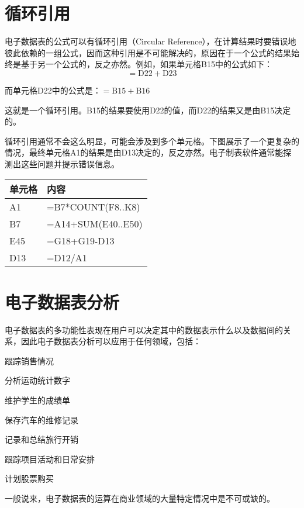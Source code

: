 \section{循环引用}


电子数据表的公式可以有循环引用（Circular Reference），在计算结果时要错误地彼此依赖的一组公式，因而这种引用是不可能解决的，原因在于一个公式的结果始终是基于另一个公式的，反之亦然。例如，如果单元格B15中的公式如下：$$=\text{D22}+\text{D23}$$


而单元格D22中的公式是：$=\text{B15}+\text{B16}$

这就是一个循环引用。B15的结果要使用D22的值，而D22的结果又是由B15决定的。

循环引用通常不会这么明显，可能会涉及到多个单元格。下图展示了一个更复杂的情况，最终单元格A1的结果是由D13决定的，反之亦然。电子制表软件通常能探测出这些问题并提示错误信息。

\begin{table}[!h]
\centering
\begin{tabular}{|p{100pt}|p{200pt}|}
\hline
单元格	&内容\\
\hline
A1		&=B7*COUNT(F8..K8)\\
\hline
B7		&=A14+SUM(E40..E50)\\
\hline
E45		&=G18+G19-D13\\
\hline
D13	&=D12/A1\\
\hline
\end{tabular}
\end{table}


\section{电子数据表分析}


电子数据表的多功能性表现在用户可以决定其中的数据表示什么以及数据间的关系，因此电子数据表分析可以应用于任何领域，包括：

\begin{compactitem}
\item 跟踪销售情况
\item 分析运动统计数字
\item 维护学生的成绩单
\item 保存汽车的维修记录
\item 记录和总结旅行开销
\item 跟踪项目活动和日常安排
\item 计划股票购买
\end{compactitem}


一般说来，电子数据表的运算在商业领域的大量特定情况中是不可或缺的。

